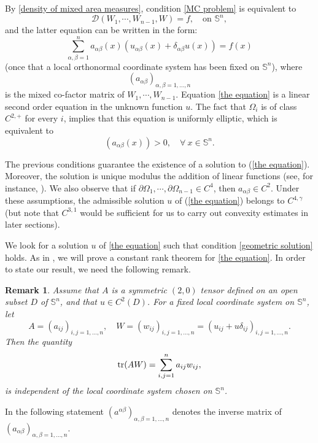 \documentclass[12pt]{amsart}
\newtheorem{remark}[theorem]{Remark}
\newcommand{\1}{\mathbf 1}
\newcommand{\s}{\mathbb S}
\newcommand{\sfe}{{{\mathbb S}^{n}}}
\begin{document}
By \eqref{density of mixed area measures}, condition \eqref{MC problem} is equivalent to
\begin{equation}\label{Prob-C}
\mathscr{D}(W_1,\cdots, W_{n-1}, W)=f, \quad \mbox{on $\s^n$},
\end{equation}
and the latter equation can be written in the form:
\begin{equation}\label{the equation}
\sum_{\alpha,\beta=1}^n a_{\alpha\beta}(x)(u_{\alpha\beta}(x)+\delta_{\alpha\beta}u(x))=f(x)
\end{equation}
(once that a local orthonormal coordinate system has been fixed on $\sfe$), where 
$$
(a_{\alpha\beta})_{\alpha,\beta=1,\dots,n}
$$ 
is the mixed co-factor matrix of $W_1,\cdots, W_{n-1}$. Equation \eqref{the equation} is a linear second order equation in the unknown function $u$. The fact that $\Omega_i$ is of class $C^{2,+}$ for every $i$, implies that this equation is uniformly elliptic, which is equivalent to
\begin{equation}\label{ellipticity}
(a_{\alpha\beta}(x))>0,\quad\forall\ x\in\sfe.
\end{equation}

The previous conditions guarantee the existence of a solution to (\ref{the equation}). Moreover, the solution is unique modulus the addition of linear functions (see, for instance, \cite{GMTZ}). We also observe that if $\partial \Omega_1,\cdots, \partial \Omega_{n-1}\in C^{4}$, then $a_{\alpha\beta}\in C^{2}$. Under these assumptions, the admissible solution $u$ of (\ref{the equation}) belongs to $C^{4,\gamma}$ (but note that $C^{3,1}$ would be sufficient for us to carry out convexity estimates in later sections).

We look for a solution $u$ of \eqref{the equation} such that condition \eqref{geometric solution} holds. As in \cite{Guan-Ma-2003}, we will prove a constant rank theorem for \eqref{the equation}. In order to state our result, we need the following remark. 

\begin{remark} Assume that $A$ is a symmetric $(2,0)$ tensor defined on an open subset $D$ of $\sfe$, and that $u\in C^2(D)$. For a fixed local coordinate system on $\sfe$, let 
$$
A=(a_{ij})_{i,j=1,\dots,n},\quad W=(w_{ij})_{i,j=1,\dots,n}=(u_{ij}+u\delta_{ij})_{i,j=1,\dots,n}.
$$
Then the quantity
$$
{\rm tr}(AW)=\sum_{i,j=1}^n a_{ij}w_{ij},
$$
is independent of the local coordinate system chosen on $\sfe$. 
\end{remark}

In the following statement $(a^{\alpha\beta})_{\alpha,\beta=1,\dots,n}$ denotes the inverse matrix of $(a_{\alpha\beta})_{\alpha,\beta=1,\dots,n}$.
\end{document}
